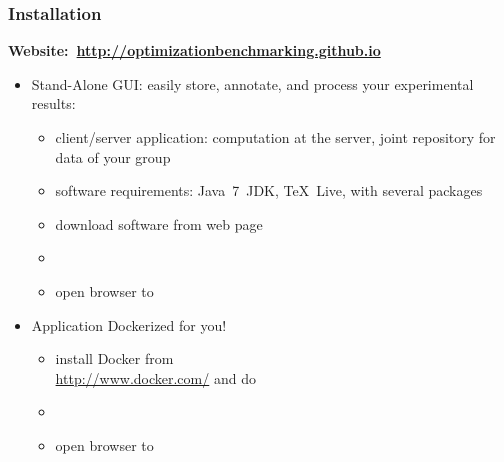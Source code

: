%
\begin{frame}[t]%
\frametitle{Installation}%
\centering\footnotesize%
%
\strut\vfill%
\mbox{\textbf{\large{Website:~\href{http://optimizationbenchmarking.github.io}{http://optimizationbenchmarking.github.io}}}}%
\vfill%
%
\begin{itemize}%
%
\item Stand-Alone GUI: easily store, annotate, and process your experimental results:%
\begin{itemize}%
\item client/server application: computation at the server, joint repository for data of your group%
\item software requirements: Java~7~JDK, TeX~Live,  with several packages%
\item download software from web page%
\item \mbox{}%
\item open browser to %
\end{itemize}%
%
\vfill\vfill%
%
\item Application Dockerized for you!%
\begin{itemize}%
\item install Docker from\\\url{http://www.docker.com/} and do%
\item \mbox{} \mbox{}%
\item open browser to %
\end{itemize}%
%
\vfill%
%
%
%
\end{itemize}%
%
\end{frame}%
%

